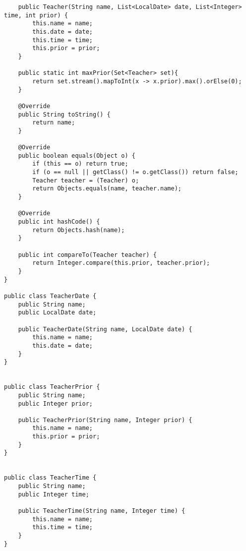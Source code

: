 \begin{lstlisting}
	public Teacher(String name, List<LocalDate> date, List<Integer> time, int prior) {
		this.name = name;
		this.date = date;
		this.time = time;
		this.prior = prior;
	}
	
	public static int maxPrior(Set<Teacher> set){
		return set.stream().mapToInt(x -> x.prior).max().orElse(0);
	}
	
	@Override
	public String toString() {
		return name;
	}
	
	@Override
	public boolean equals(Object o) {
		if (this == o) return true;
		if (o == null || getClass() != o.getClass()) return false;
		Teacher teacher = (Teacher) o;
		return Objects.equals(name, teacher.name);
	}
	
	@Override
	public int hashCode() {
		return Objects.hash(name);
	}
	
	public int compareTo(Teacher teacher) {
		return Integer.compare(this.prior, teacher.prior);
	}
}

public class TeacherDate {
	public String name;
	public LocalDate date;
	
	public TeacherDate(String name, LocalDate date) {
		this.name = name;
		this.date = date;
	}
}


public class TeacherPrior {
	public String name;
	public Integer prior;
	
	public TeacherPrior(String name, Integer prior) {
		this.name = name;
		this.prior = prior;
	}
}


public class TeacherTime {
	public String name;
	public Integer time;
	
	public TeacherTime(String name, Integer time) {
		this.name = name;
		this.time = time;
	}
}


\end{lstlisting}